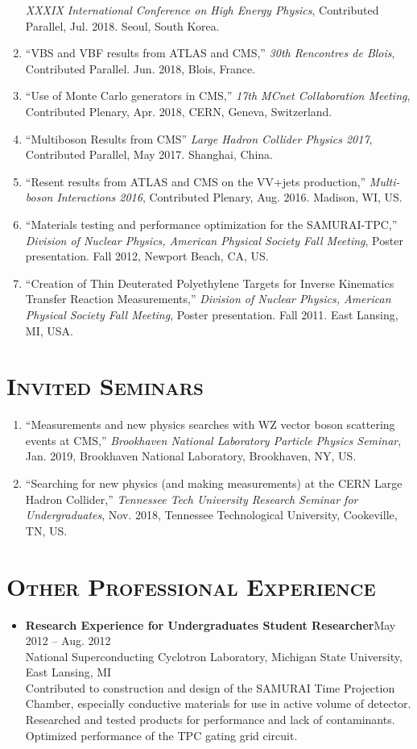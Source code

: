 \documentclass[10pt]{res} %
\begin{document}
\begin{resume}
\begin{enumerate}
    \emph{XXXIX International Conference on High Energy Physics}, Contributed Parallel, Jul. 2018. Seoul, South Korea.
  \item ``VBS and VBF results from ATLAS and CMS,''
    \emph{30th Rencontres de Blois}, Contributed Parallel. Jun. 2018, Blois, France.
  \item ``Use of Monte Carlo generators in CMS,'' 
    \emph{17th MCnet Collaboration Meeting}, Contributed Plenary, Apr. 2018, CERN, Geneva, Switzerland.
  \item ``Multiboson Results from CMS''
    \emph{Large Hadron Collider Physics 2017}, Contributed Parallel, May 2017. Shanghai, China.
  \item ``Resent results from ATLAS and CMS on the VV+jets production,''
    \emph{Multi-boson Interactions 2016}, Contributed Plenary, Aug. 2016. Madison, WI, US.
  \item ``Materials testing and performance optimization for the SAMURAI-TPC,''
    \emph{Division of Nuclear Physics, American Physical Society Fall Meeting}, Poster presentation. Fall 2012, Newport Beach, CA, US.
  \item ``Creation of Thin Deuterated Polyethylene Targets for Inverse Kinematics Transfer Reaction Measurements,''
    \emph{Division of Nuclear Physics, American Physical Society Fall Meeting}, Poster presentation. Fall 2011. East Lansing, MI, USA.
\end{enumerate}

\section{\textsc{Invited Seminars}}
\begin{enumerate}
 \item ``Measurements and new physics searches with WZ vector boson scattering events at CMS,''
     \emph{Brookhaven National Laboratory Particle Physics Seminar}, Jan. 2019, Brookhaven National Laboratory, Brookhaven, NY, US.
  \item ``Searching for new physics (and making measurements) at the CERN Large Hadron Collider,''
     \emph{Tennessee Tech University Research Seminar for Undergraduates}, Nov. 2018, Tennessee Technological University, Cookeville, TN, US.
\end{enumerate}

\section{\textsc{Other Professional Experience}}
\begin{itemize}
\item \textbf{Research Experience for Undergraduates Student Researcher}\hfill{May 2012 -- Aug. 2012} \\
National Superconducting Cyclotron Laboratory, Michigan State University, East Lansing, MI \\
Contributed to construction and design of the SAMURAI Time Projection Chamber,
especially conductive materials for use in active 
volume of detector. Researched and tested products for performance and lack 
of contaminants. Optimized performance of the TPC gating grid circuit.


\end{itemize}
\end{resume}
\end{document}
